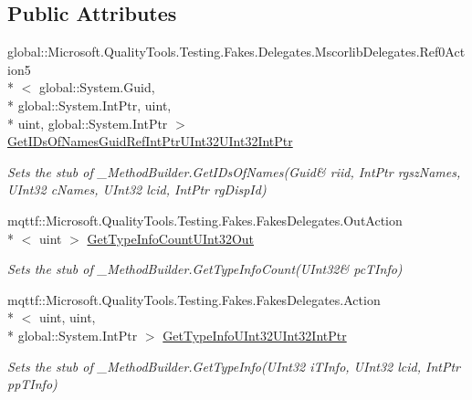 \subsection*{Public Attributes}
\begin{DoxyCompactItemize}
\item 
global\-::\-Microsoft.\-Quality\-Tools.\-Testing.\-Fakes.\-Delegates.\-Mscorlib\-Delegates.\-Ref0\-Action5\\*
$<$ global\-::\-System.\-Guid, \\*
global\-::\-System.\-Int\-Ptr, uint, \\*
uint, global\-::\-System.\-Int\-Ptr $>$ \hyperlink{class_system_1_1_runtime_1_1_interop_services_1_1_fakes_1_1_stub___method_builder_a0658914f86252d5dd35463beaabf9ef0}{Get\-I\-Ds\-Of\-Names\-Guid\-Ref\-Int\-Ptr\-U\-Int32\-U\-Int32\-Int\-Ptr}
\begin{DoxyCompactList}\small\item\em Sets the stub of \-\_\-\-Method\-Builder.\-Get\-I\-Ds\-Of\-Names(Guid\& riid, Int\-Ptr rgsz\-Names, U\-Int32 c\-Names, U\-Int32 lcid, Int\-Ptr rg\-Disp\-Id)\end{DoxyCompactList}\item 
mqttf\-::\-Microsoft.\-Quality\-Tools.\-Testing.\-Fakes.\-Fakes\-Delegates.\-Out\-Action\\*
$<$ uint $>$ \hyperlink{class_system_1_1_runtime_1_1_interop_services_1_1_fakes_1_1_stub___method_builder_a047c70498e7b4dde9a80a07edc3ea1df}{Get\-Type\-Info\-Count\-U\-Int32\-Out}
\begin{DoxyCompactList}\small\item\em Sets the stub of \-\_\-\-Method\-Builder.\-Get\-Type\-Info\-Count(U\-Int32\& pc\-T\-Info)\end{DoxyCompactList}\item 
mqttf\-::\-Microsoft.\-Quality\-Tools.\-Testing.\-Fakes.\-Fakes\-Delegates.\-Action\\*
$<$ uint, uint, \\*
global\-::\-System.\-Int\-Ptr $>$ \hyperlink{class_system_1_1_runtime_1_1_interop_services_1_1_fakes_1_1_stub___method_builder_a87c9655a4bf9129f871d7c228ac21801}{Get\-Type\-Info\-U\-Int32\-U\-Int32\-Int\-Ptr}
\begin{DoxyCompactList}\small\item\em Sets the stub of \-\_\-\-Method\-Builder.\-Get\-Type\-Info(\-U\-Int32 i\-T\-Info, U\-Int32 lcid, Int\-Ptr pp\-T\-Info)\end{DoxyCompactList}\item 

\end{DoxyCompactItemize}
